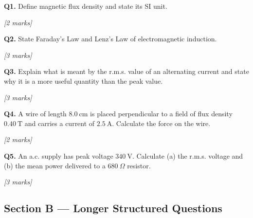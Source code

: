\begin{tcolorbox}[colback=white, colframe=midblue, breakable]

\begin{minipage}{\linewidth}
\textbf{Q1.} Define magnetic flux density and state its SI unit.
\par\hfill\textit{[2 marks]}
\vspace{2.5cm}
\end{minipage}

\begin{minipage}{\linewidth}
\textbf{Q2.} State Faraday's Law and Lenz's Law of electromagnetic induction.
\par\hfill\textit{[3 marks]}
\vspace{3cm}
\end{minipage}

\begin{minipage}{\linewidth}
\textbf{Q3.} Explain what is meant by the r.m.s. value of an alternating current and state why it is a more useful quantity than the peak value.
\par\hfill\textit{[3 marks]}
\vspace{3cm}
\end{minipage}

\begin{minipage}{\linewidth}
\textbf{Q4.} A wire of length $8.0\ \text{cm}$ is placed perpendicular to a field of flux density $0.40\ \text{T}$ and carries a current of $2.5\ \text{A}$. Calculate the force on the wire.
\par\hfill\textit{[2 marks]}
\vspace{2.5cm}
\end{minipage}

\begin{minipage}{\linewidth}
\textbf{Q5.} An a.c. supply has peak voltage $340\ \text{V}$. Calculate (a) the r.m.s. voltage and (b) the mean power delivered to a $680\ \Omega$ resistor.
\par\hfill\textit{[3 marks]}
\vspace{3cm}
\end{minipage}

\end{tcolorbox}

\subsection*{Section B — Longer Structured Questions}

